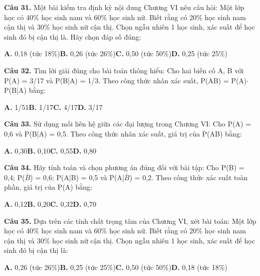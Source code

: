 \documentclass[11pt,a4paper]{article}
\begin{document}
\textbf{\color{primary} Câu 31.} Một bài kiểm tra định kỳ nội dung Chương VI nêu câu hỏi: Một lớp học có 40\% học sinh nam và 60\% học sinh nữ. Biết rằng có 20\% học sinh nam cận thị và 30\% học sinh nữ cận thị. Chọn ngẫu nhiên 1 học sinh, xác suất để học sinh đó bị cận thị là. Hãy chọn đáp số đúng:\par
\hspace*{1.5em}\textbf{A.} 0,18 (tức 18\%)\quad\quad \textbf{B.} 0,26 (tức 26\%)\quad\quad \textbf{C.} 0,50 (tức 50\%)\quad\quad \textbf{D.} 0,25 (tức 25\%)\par\vspace{2pt}
\textbf{\color{primary} Câu 32.} Tìm lời giải đúng cho bài toán thông hiểu: Cho hai biến cố A, B với P(A) = 3/17 và P(B|A) = 1/3. Theo công thức nhân xác suất, P(AB) = P(A)$\cdot$P(B|A) bằng:\par
\hspace*{1.5em}\textbf{A.} 1/51\quad\quad \textbf{B.} 1/17\quad\quad \textbf{C.} 4/17\quad\quad \textbf{D.} 3/17\par\vspace{2pt}
\textbf{\color{primary} Câu 33.} Sử dụng mối liên hệ giữa các đại lượng trong Chương VI: Cho P(A) = 0,6 và P(B|A) = 0,5. Theo công thức nhân xác suất, giá trị của P(AB) bằng:\par
\hspace*{1.5em}\textbf{A.} 0,30\quad\quad \textbf{B.} 0,10\quad\quad \textbf{C.} 0,55\quad\quad \textbf{D.} 0,80\par\vspace{2pt}
\textbf{\color{primary} Câu 34.} Hãy tính toán và chọn phương án đúng đối với bài tập: Cho P(B) = 0,4; P($\bar{B}$) = 0,6; P(A|B) = 0,5 và P(A|$\bar{B}$) = 0,2. Theo công thức xác suất toàn phần, giá trị của P(A) bằng:\par
\hspace*{1.5em}\textbf{A.} 0,12\quad\quad \textbf{B.} 0,20\quad\quad \textbf{C.} 0,32\quad\quad \textbf{D.} 0,70\par\vspace{2pt}
\textbf{\color{primary} Câu 35.} Dựa trên các tính chất trọng tâm của Chương VI, xét bài toán: Một lớp học có 40\% học sinh nam và 60\% học sinh nữ. Biết rằng có 20\% học sinh nam cận thị và 30\% học sinh nữ cận thị. Chọn ngẫu nhiên 1 học sinh, xác suất để học sinh đó bị cận thị là:\par
\hspace*{1.5em}\textbf{A.} 0,26 (tức 26\%)\quad\quad \textbf{B.} 0,25 (tức 25\%)\quad\quad \textbf{C.} 0,50 (tức 50\%)\quad\quad \textbf{D.} 0,18 (tức 18\%)\par\vspace{2pt}
\end{document}
